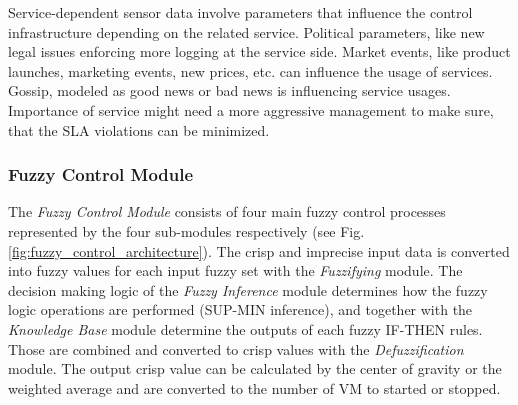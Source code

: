 Service-dependent sensor data involve parameters that influence the control infrastructure depending on the related service. Political parameters, like new legal issues enforcing more logging at the service side. Market events, like product launches, marketing events, new prices, etc. can influence the usage of services. Gossip, modeled as good news or bad news is influencing service usages. Importance of service might need a more aggressive management to make sure, that the SLA violations can be minimized.

\subsubsection{Fuzzy Control Module}\label{fuzzyControlModule}
The \textit{Fuzzy Control Module} consists of four main fuzzy control processes represented by the four sub-modules respectively (see Fig. \ref{fig:fuzzy_control_architecture}). The crisp and imprecise input data is converted into fuzzy values for each input fuzzy set with the \textit{Fuzzifying} module.
The decision making logic of the \textit{Fuzzy Inference} module determines how the fuzzy logic operations are performed (SUP-MIN inference), and together with the \textit{Knowledge Base} module determine the outputs of each fuzzy IF-THEN rules. Those are combined and converted to crisp values with the \textit{Defuzzification} module. The output crisp value can be calculated by the center of gravity or the weighted average and are converted to the number of VM to started or stopped.

